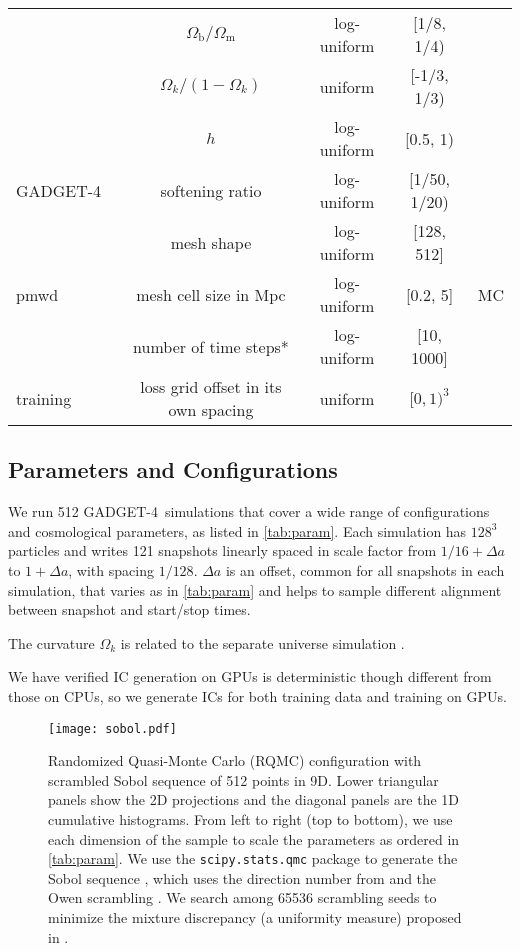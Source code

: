 \documentclass[modern, trackchanges, dvipsnames]{aastex631}
\newcommand{\pmwd}{{\usefont{T1}{nova}{m}{sl}pmwd}}
\newcommand{\GADGET}{{{\fontsize{10pt}{12pt}\selectfont GADGET}-4}}
\newcommand{\Omegam}{\Omega_\mathrm{m}}
\newcommand{\Omegab}{\Omega_\mathrm{b}}
\begin{document}
\begin{table*}
\begin{tabular}{lcccr}
\cmidrule(lr){2-4}
& $\Omegab / \Omegam$ & log-uniform & [1/8, 1/4) \\
\cmidrule(lr){2-4}
& $\Omega_k / (1 - \Omega_k)$ & uniform & [-1/3, 1/3) \\
\cmidrule(lr){2-4}
& $h$ & log-uniform & [0.5, 1) \\
\cmidrule(lr){1-4}
\GADGET\ & softening ratio & log-uniform & [1/50, 1/20) \\
\cmidrule(lr){1-5}
& mesh shape & log-uniform & [128, 512] \\
\cmidrule(lr){2-4}
\pmwd\ & mesh cell size in Mpc & log-uniform & [0.2, 5] & MC \\
\cmidrule(lr){2-4}
& number of time steps* & log-uniform & [10, 1000] \\
\cmidrule(lr){1-4}
training & loss grid offset in its own spacing & uniform & $[0, 1)^3$ \\
\bottomrule
\end{tabular}
\end{table*}


\vspace{1em}
\subsection{Parameters and Configurations}

We run 512 \GADGET\ simulations that cover a wide range of
configurations and cosmological parameters, as listed in
\autoref{tab:param}.
Each simulation has $128^3$ particles and writes 121 snapshots linearly
spaced in scale factor from $1/16 + \Delta a$ to $1 + \Delta a$, with
spacing $1/128$.
$\Delta a$ is an offset, common for all snapshots in each simulation,
that varies as in \autoref{tab:param} and helps to sample different
alignment between snapshot and start/stop times.

The curvature $\Omega_k$ is related to the separate universe simulation
\citep{LiEtAl2014, WagnerEtAl2015}.

We have verified IC generation on GPUs is deterministic though different
from those on CPUs, so we generate ICs for both training data and
training on GPUs.


\begin{figure*}
  \centering
  \texttt{[image: sobol.pdf]}
  \caption{Randomized Quasi-Monte Carlo (RQMC) configuration with
    scrambled Sobol sequence of 512 points in 9D.
    Lower triangular panels show the 2D projections and the diagonal
    panels are the 1D cumulative histograms.
    From left to right (top to bottom), we use each dimension of the
    sample to scale the parameters as ordered in \autoref{tab:param}.
    We use the \texttt{scipy.stats.qmc} package \citep{SciPy} to
    generate the Sobol sequence \citep{Sobol1967}, which uses the
    direction number from \citet{JoeKuo2008} and the Owen scrambling
    \citep{Owen1998}.
    We search among 65536 scrambling seeds to minimize the mixture
    discrepancy (a uniformity measure) proposed in \citet{Zhou2013MD}.
  }
  \label{fig:sobol}
\end{figure*}
\end{document}
